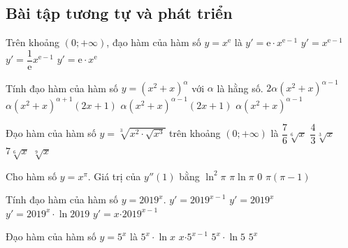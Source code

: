\subsection{Bài tập tương tự và phát triển}
\begin{ex}%
	Trên khoảng $(0; +\infty)$, đạo hàm của hàm số $y=x^\mathrm{e}$ là
	\choice
	{\True $y'=\mathrm{e} \cdot x^{\mathrm{e}-1}$}
	{$y'=x^{\mathrm{e}-1}$}
	{$y'=\dfrac{1}{\mathrm{e}} x^{\mathrm{e}-1}$}
	{$y'=\mathrm{e} \cdot x^\mathrm{e}$}
\end{ex}
\begin{ex}%
	Tính đạo hàm của hàm số $y=\left(x^2+x\right)^\alpha$ với $\alpha$ là hằng số.
	\choice
	{$2\alpha\left(x^2+x\right)^{\alpha-1}$}
	{$\alpha\left(x^2+x\right)^{\alpha+1}\left(2x+1\right)$}
	{\True $\alpha\left(x^2+x\right)^{\alpha-1}\left(2x+1\right)$}
	{$\alpha\left(x^2+x\right)^{\alpha-1}$}
\end{ex}
\begin{ex}%
	Đạo hàm của hàm số $y=\sqrt[3]{x^2\cdot\sqrt{x^3}}$ trên khoảng $\left(0;+\infty\right)$ là
	\choice
	{\True $\dfrac{7}{6}\sqrt[6]{x}$}
	{$\dfrac{4}{3}\sqrt[3]{x}$}
	{$7\sqrt[6]{x}$}
	{$\sqrt[9]{x}$}
\end{ex}
\begin{ex}%
	Cho hàm số $y=x^\pi$. Giá trị của $y''\left(1\right)$ bằng
	\choice
	{$\ln^2\pi$}
	{$\pi\ln\pi$}
	{$0$}
	{\True $\pi\left(\pi-1\right)$}
\end{ex}

\begin{ex}%
	Tính đạo hàm của hàm số $ y={{2019}^x}$.
	\choice
	{ $y'={{2019}^{x-1}}$}
	{ $y'={{2019}^x}$}
	{\True $y'={{2019}^x}\cdot \ln 2019$}
	{ $y'=x{{\cdot 2019}^{x-1}}$}
\end{ex}
\begin{ex}%
	Đạo hàm của hàm số $ y={5^x}$ là
	\choice
	{ ${5^x}\cdot \ln x$}
	{ $ x{{\cdot 5}^{x-1}}$}
	{\True ${5^x}\cdot \ln 5$}
	{ ${5^x}$}
\end{ex}

